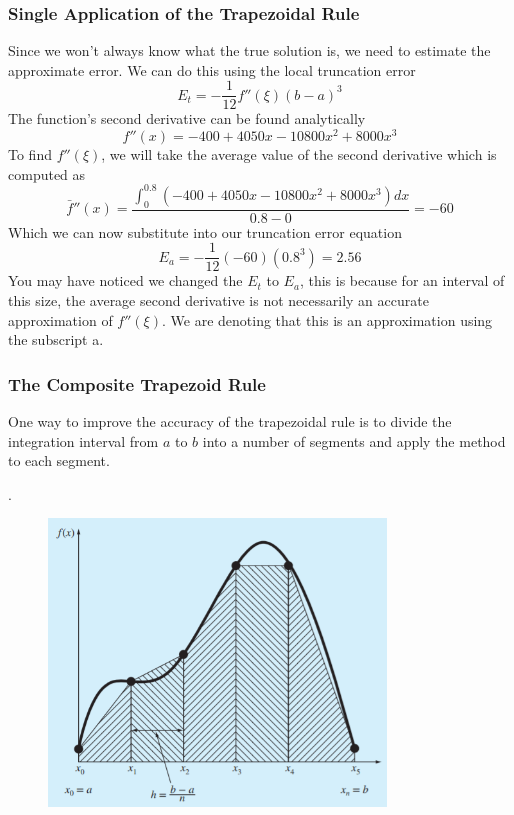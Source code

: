\documentclass{if-beamer}
\begin{document}
\begin{frame}
	\frametitle{Single Application of the Trapezoidal Rule}
	Since we won't always know what the true solution is, we need to estimate the approximate error. We can do this using the local truncation error
	$$E_t =-\frac{1}{12}f''(\xi)(b-a)^3$$
	The function's second derivative can be found analytically
	$$f''(x) = -400+4050x-10800x^2+8000x^3$$
	To find $f''(\xi)$, we will take the average value of the second derivative which is computed as
	$$ \bar{f}''(x) = \frac{\int_{0}^{0.8}(-400+4050x-10800x^2+8000x^3)dx}{0.8-0} = -60$$
	Which we can now substitute into our truncation error equation
	$$E_a = -\frac{1}{12}(-60)(0.8^3) = 2.56$$
	You may have noticed we changed the $E_t$ to $E_a$, this is because for an interval of this size, the average second derivative is not necessarily an accurate approximation of $f''(\xi)$. We are denoting that this is an approximation using the subscript a. 
\end{frame}

\begin{frame}
	\frametitle{The Composite Trapezoid Rule}
	One way to improve the accuracy of the trapezoidal rule is to divide the integration interval from $a$ to $b$ into a number of segments and apply the method to each segment.\\\vspace{10pt}
	\begin{minipage}{0.5\textwidth}
		.
	\end{minipage}
	\begin{minipage}{0.5\textwidth}
		\begin{figure}
			\centering
			\includegraphics[width=0.8\textwidth]{figures/compositeTrap}
		\end{figure}
	\end{minipage}
\end{frame}
\end{document}
